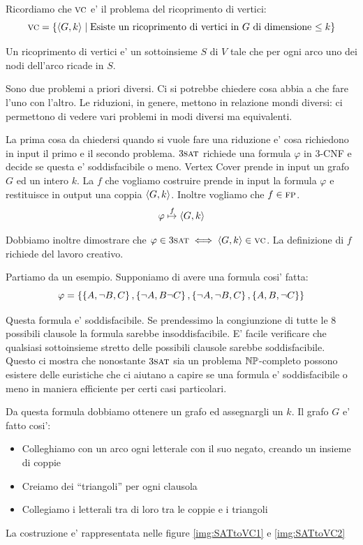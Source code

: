 Ricordiamo che $\textsc{vc}$ e' il problema del ricoprimento di vertici:
\begin{equation*}
    \textsc{vc} = \left\{\langle G, k \rangle \mid \text{Esiste un ricoprimento di vertici in $G$ di dimensione $\leq k$}\right\}
\end{equation*}

Un ricoprimento di vertici e' un sottoinsieme $S$ di $V$ tale che per ogni arco uno dei nodi
dell'arco ricade in $S$.

Sono due problemi a priori diversi. Ci si potrebbe chiedere cosa abbia a che fare l'uno con l'altro.
Le riduzioni, in genere, mettono in relazione mondi diversi: ci permettono di vedere vari problemi
in modi diversi ma equivalenti.

La prima cosa da chiedersi quando si vuole fare una riduzione e' cosa richiedono in input il primo e
il secondo problema. $3\textsc{sat}$ richiede una formula $\varphi$ in 3-CNF e decide se questa e'
soddisfacibile o meno. Vertex Cover prende in input un grafo $G$ ed un intero $k$. La $f$ che
vogliamo costruire prende in input la formula $\varphi$ e restituisce in output una coppia
$\langle G, k \rangle$. Inoltre vogliamo che $f \in \textsc{fp}$.
\begin{equation*}
    \varphi \overset{f}{\mapsto} \langle G, k \rangle
\end{equation*}

Dobbiamo inoltre dimostrare che $\varphi \in 3\textsc{sat} \iff \langle G, k \rangle \in \textsc{vc}$. La definizione di $f$
richiede del lavoro creativo.

Partiamo da un esempio. Supponiamo di avere una formula cosi' fatta:
\begin{equation*}
    \varphi = \left\{\left\{A,\lnot B, C\right\},\left\{\lnot A, B \lnot C\right\},\left\{\lnot A,\lnot B, C\right\},\left\{A,B,\lnot
    C\right\}\right\}
\end{equation*}

Questa formula e' soddisfacibile. Se prendessimo la congiunzione di tutte le 8 possibili clausole la
formula sarebbe insoddisfacibile. E' facile verificare che qualsiasi sottoinsieme stretto delle
possibili clausole sarebbe soddisfacibile. Questo ci mostra che nonostante $3\textsc{sat}$ sia un problema
$\mathbb{NP}$-completo possono esistere delle euristiche che ci aiutano a capire se una formula e'
soddisfacibile o meno in maniera efficiente per certi casi particolari.

Da questa formula dobbiamo ottenere un grafo ed assegnargli un $k$. Il grafo $G$ e' fatto cosi':
\begin{itemize}
        \item Colleghiamo con un arco ogni letterale con il suo negato, creando un insieme di coppie
        \item Creiamo dei ``triangoli'' per ogni clausola
        \item Collegiamo i letterali tra di loro tra le coppie e i triangoli
\end{itemize}
La costruzione e' rappresentata nelle figure \ref{img:SATtoVC1} e \ref{img:SATtoVC2}

